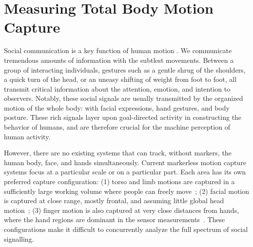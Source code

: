 
\chapter{Measuring Total Body Motion Capture}
\label{chapter:totalcapture}



Social communication is a key function of human motion \cite{Birdwhistell-1970}. We communicate tremendous amounts of information with the subtlest movements. Between a group of interacting individuals, gestures such as a gentle shrug of the shoulders, a quick turn of the head, or an uneasy shifting of weight from foot to foot, all transmit critical information about the attention, emotion, and intention to observers. Notably, these social signals are usually transmitted by the organized motion of the whole body: with facial expressions, hand gestures, and body posture. These rich signals layer upon goal-directed activity in constructing the behavior of humans, and are therefore crucial for the machine perception of human activity. 

However, there are no existing systems that can track, without markers, the human body, face, and hands simultaneously. Current markerless motion capture systems focus at a particular scale or on a particular part. Each area has its own preferred capture configuration: (1) torso and limb motions are captured in a sufficiently large working volume where people can freely move~\cite{de2008performance, Gall-09, Stoll-11, Elhayek-15}; (2) facial motion is captured at close range, mostly frontal, and assuming little global head motion~\cite{beeler2010high,ghosh2011multiview,Beeler2011, bradley2010high, valgaerts2012lightweight}; (3) finger motion is also captured at very close distances from hands, where the hand regions are dominant in the sensor measurements~\cite{Oikonomidis-12, Tompson-14a, Sridha-15, Tzionas-16}. These configurations make it difficult to concurrently analyze the full spectrum of social signalling.



